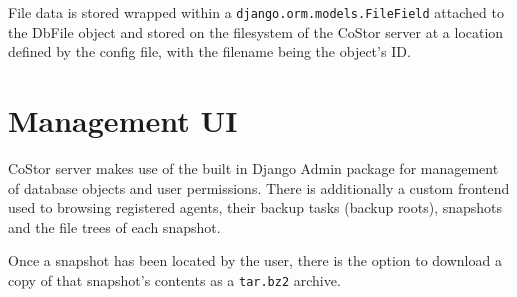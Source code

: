 \documentclass[bsc,frontabs,twoside,singlespacing,parskip,deptreport]{infthesis}     %
\begin{document}
File data is stored wrapped within a \texttt{django.orm.models.FileField} attached to the DbFile 
object and stored on the filesystem of the CoStor server at a location defined by the config file,
with the filename being the object's ID.

\section{Management UI}

CoStor server makes use of the built in Django Admin package for management of database objects 
and user permissions. There is additionally a custom frontend used to browsing registered agents,
their backup tasks (backup roots), snapshots and the file trees of each snapshot.

Once a snapshot has been located by the user, there is the option to download a copy of that
snapshot's contents as a \texttt{tar.bz2} archive.
\end{document}
